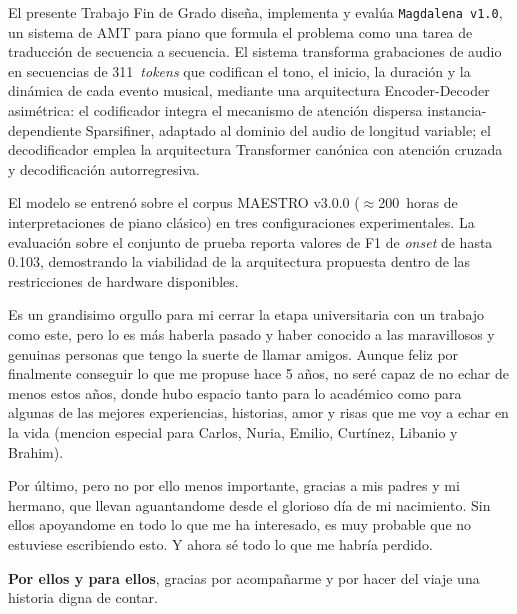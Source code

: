 El presente Trabajo Fin de Grado diseña, implementa y evalúa
\texttt{Magdalena v1.0}, un sistema de AMT para piano que formula el
problema como una tarea de traducción de secuencia a secuencia. El
sistema transforma grabaciones de audio en secuencias de
311~\textit{tokens} que codifican el tono, el inicio, la duración y
la dinámica de cada evento musical, mediante una arquitectura
Encoder-Decoder asimétrica: el codificador integra el mecanismo de
atención dispersa instancia-dependiente Sparsifiner, adaptado al
dominio del audio de longitud variable; el decodificador emplea la
arquitectura Transformer canónica con atención cruzada y
decodificación autorregresiva.

El modelo se entrenó sobre el corpus MAESTRO v3.0.0
($\approx$200~horas de interpretaciones de piano clásico) en tres
configuraciones experimentales. La evaluación sobre el conjunto de
prueba reporta valores de F1 de \textit{onset} de hasta 0.103,
demostrando la viabilidad de la arquitectura propuesta dentro de las
restricciones de hardware disponibles.

\cleardoublepage
\thispagestyle{plain}
\begin{center}
\Large{}
\end{center}
\vskip1cm
Es un grandisimo orgullo para mi cerrar la etapa universitaria con un trabajo como este, pero lo es más haberla pasado y haber conocido a las maravillosos y genuinas personas que tengo la suerte de llamar amigos. Aunque feliz por finalmente conseguir lo que me propuse hace 5 años, no seré capaz de no echar de menos estos años, donde hubo espacio tanto para lo académico como para algunas de las mejores experiencias, historias, amor y risas que me voy a echar en la vida (mencion especial para Carlos, Nuria, Emilio, Curtínez, Libanio y Brahim).


Por último, pero no por ello menos importante, gracias a mis padres y mi hermano, que llevan aguantandome desde el glorioso día de mi nacimiento. Sin ellos apoyandome en todo lo que me ha interesado, es muy probable que no estuviese escribiendo esto. Y ahora sé todo lo que me habría perdido. 


\textbf{Por ellos y para ellos}, gracias por acompañarme y por hacer del viaje una historia digna de contar.
